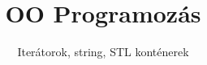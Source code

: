 \documentclass[usenames,dvipsnames,aspectratio=169]{beamer}
\title[OO Programozás - C++]{OO Programozás}
\subtitle{Iterátorok, string, STL konténerek}
\begin{document}
\begin{frame}[plain]
  \titlepage
  \logoalul
\end{frame}




\end{document}
